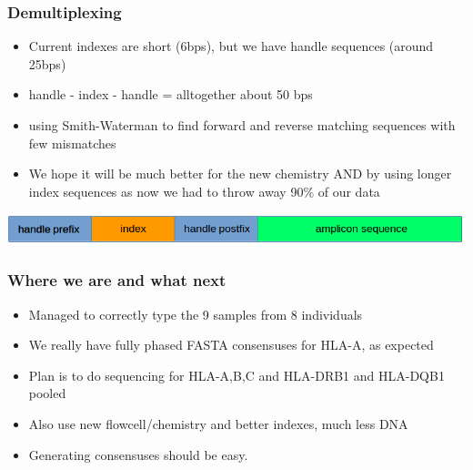 \documentclass{beamer}
\begin{document}
\begin{frame}
\frametitle{Demultiplexing}
\begin{itemize}
	\item Current indexes are short (6bps), but we have handle sequences (around 25bps)
	\item handle - index - handle = alltogether about 50 bps
	\item using Smith-Waterman to find forward and reverse matching sequences with few mismatches
	\item We hope it will be much better for the new chemistry AND by using longer index sequences as now we 
had to throw away 90\% of our data
\end{itemize}
\includegraphics[width=0.9\linewidth]{handle_index.png}
\end{frame}

\begin{frame}
\frametitle{Where we are and what next}
\begin{itemize}
	\item Managed to correctly type the 9 samples from 8 individuals
	\item We really have fully phased FASTA consensuses for HLA-A, as expected
	\item Plan is to do sequencing for HLA-A,B,C and HLA-DRB1 and HLA-DQB1 pooled
	\item Also use new flowcell/chemistry and better indexes, much less DNA
	\item Generating consensuses should be easy.
\end{itemize}
\end{frame}
\end{document}
